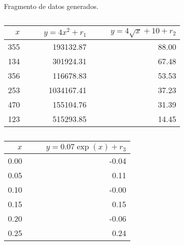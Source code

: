 \documentclass[12pt,letterpaper]{article}
\begin{document}
\begin{table}
\caption{Fragmento de datos generados.}
\begin{subtable}{0.3\textwidth}
	\centering
	\caption{}
	\begin{tabular}{rrr}
  \hline
$x$ & $\qquad y=4x^2+ r_1$ & $\qquad y=4\sqrt x+10 + r_2$ \\ 
  \hline
355 & 193132.87 & 88.00 \\ 
134 & 301924.31 & 67.48 \\ 
356 & 116678.83 & 53.53 \\ 
253 & 1034167.41 & 37.23 \\ 
470 & 155104.76 & 31.39 \\ 
123 & 515293.85 & 14.45 \\ 
   \hline
\end{tabular}
	\label{a}
\end{subtable}
\hfill
\begin{subtable}{0.3\textwidth}
	\centering
	\caption{}
\begin{tabular}{rr}
  \hline
 $x$ & $\qquad y=0.07\exp (x) + r_3$ \\ 
  \hline
0.00 & -0.04 \\ 
0.05 & 0.11 \\ 
0.10 & -0.00 \\ 
0.15 & 0.15 \\ 
0.20 & -0.06 \\ 
0.25 & 0.24 \\ 
   \hline
\end{tabular}
	\label{b}
\end{subtable}
\end{table}
\end{document}
